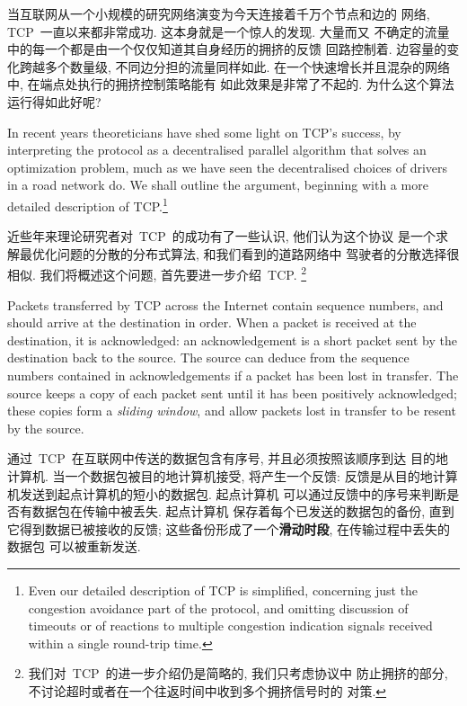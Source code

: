 \documentclass[a4paper,12pt, twocolumn]{article}
\begin{document}
当互联网从一个小规模的研究网络演变为今天连接着千万个节点和边的
网络, TCP~一直以来都非常成功. 这本身就是一个惊人的发现. 大量而又
不确定的流量中的每一个都是由一个仅仅知道其自身经历的拥挤的反馈
回路控制着. 边容量的变化跨越多个数量级, 不同边分担的流量同样如此. 
在一个快速增长并且混杂的网络中, 在端点处执行的拥挤控制策略能有
如此效果是非常了不起的. 为什么这个算法运行得如此好呢? 

In recent years
theoreticians have shed some light on TCP's success,
by interpreting the protocol as a decentralised parallel
algorithm that solves an optimization problem, 
much as we have seen the decentralised choices of drivers in a road
network do. 
We shall outline the argument, beginning with a more
detailed description of TCP.\footnote{Even our detailed description of TCP
is simplified, concerning just the congestion avoidance
part of the protocol, and omitting discussion of timeouts or of
reactions to multiple congestion indication signals received
within a single round-trip time. }

近些年来理论研究者对~TCP~的成功有了一些认识, 他们认为这个协议
是一个求解最优化问题的分散的分布式算法, 和我们看到的道路网络中
驾驶者的分散选择很相似. 我们将概述这个问题, 首先要进一步介绍~TCP. 
\footnote{我们对~TCP~的进一步介绍仍是简略的, 我们只考虑协议中
防止拥挤的部分, 不讨论超时或者在一个往返时间中收到多个拥挤信号时的
对策. }

Packets transferred by TCP across the Internet 
contain sequence numbers, and should
arrive  at the destination in order.  When
a packet is received at the destination, it
is acknowledged: an acknowledgement is a short packet 
sent by the destination back to the source. The source
can deduce from the sequence numbers contained in
acknowledgements if a packet has been lost in transfer. 
The source keeps a copy of
each packet sent until it has been positively acknowledged;
these copies form a {\it sliding window}, and allow packets
lost in transfer to be resent by the source. 

通过~TCP~在互联网中传送的数据包含有序号, 并且必须按照该顺序到达
目的地计算机. 当一个数据包被目的地计算机接受, 将产生一个反馈: 
反馈是从目的地计算机发送到起点计算机的短小的数据包. 起点计算机
可以通过反馈中的序号来判断是否有数据包在传输中被丢失. 起点计算机
保存着每个已发送的数据包的备份, 直到它得到数据已被接收的反馈; 
这些备份形成了一个\textbf{滑动时段}, 在传输过程中丢失的数据包
可以被重新发送. 
\end{document}
